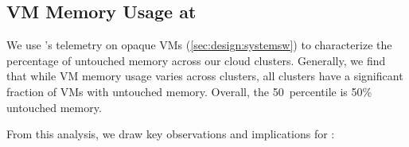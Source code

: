 \subsection{VM Memory Usage at \azure}
\label{sec-utilization-frigid}

We use \sys's telemetry on opaque VMs (\sec\ref{sec:design:systemsw}) to characterize the percentage of
untouched memory across our cloud clusters.
Generally, we find that while VM memory usage varies across clusters,
all clusters have a significant fraction of VMs with untouched memory.
Overall, the 50\th\ percentile is 50\% untouched memory.



  From this analysis, we draw key
observations and implications for \sys:

